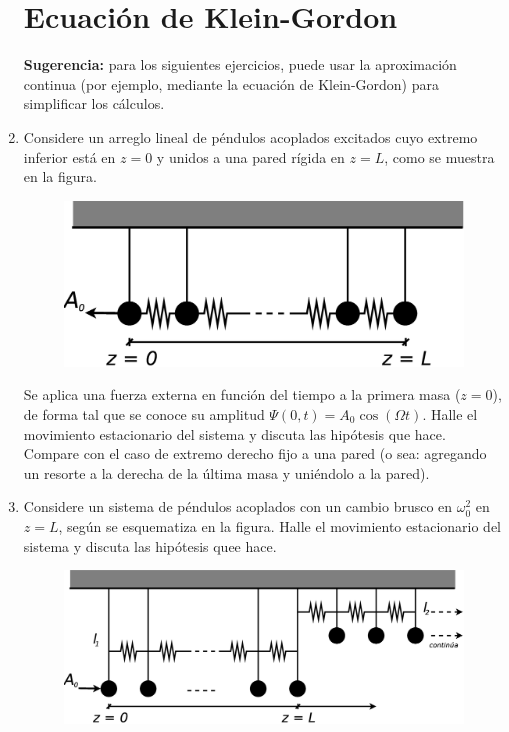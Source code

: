 \documentclass[11pt,spanish]{article}
\begin{document}
\begin{enumerate}
\section*{Ecuación de Klein-Gordon}

    \textbf{Sugerencia:} para los siguientes ejercicios, puede usar la
    aproximación continua (por ejemplo, mediante la ecuación de Klein-Gordon)
    para simplificar los cálculos.


    \item Considere un arreglo lineal de péndulos acoplados excitados cuyo
    extremo inferior está en $z=0$ y unidos a una pared rígida en $z=L$, como
    se muestra en la figura.

    \begin{figure}[H]
        \centering{}\includegraphics[clip,scale=0.25]{figs/ej1-15}
    \end{figure}

    Se aplica una fuerza externa en función del tiempo a la primera masa
    ($z=0$), de forma tal que se conoce su amplitud
    $\Psi(0,t)=A_{0}\cos(\Omega t)$. Halle el movimiento estacionario del
    sistema y discuta las hipótesis que hace. Compare con el caso de extremo
    derecho fijo a una pared (o sea: agregando un resorte a la derecha de la
    última masa y uniéndolo a la pared).


    \item Considere un sistema de péndulos acoplados con un cambio brusco en
    $\omega_{0}^{2}$ en $z=L$, según se esquematiza en la figura. Halle el
    movimiento estacionario del sistema y discuta las hipótesis quee hace.

    \begin{figure}[H]
        \centering{}\includegraphics[clip,scale=0.25]{figs/ej1-16}
    \end{figure}


\end{enumerate}
\end{document}
